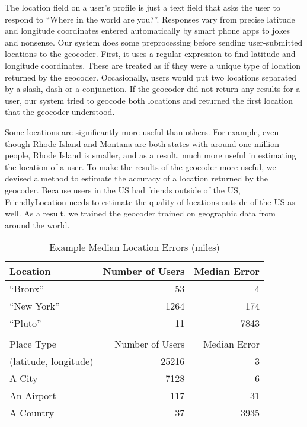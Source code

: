 The location field on a user's profile is just a text field that asks the user
to respond to ``Where in the world are you?''.
Responses vary from precise latitude and longitude coordinates entered
automatically by smart phone apps to jokes and nonsense.
Our system does some preprocessing before sending user-submitted locations to
the geocoder.
First, it uses a regular expression to find latitude and longitude coordinates.
These are treated as if they were a unique type of location returned by the
geocoder.
Occasionally, users would put two locations separated by a slash, dash or a
conjunction.
If the geocoder did not return any results for a user, our system tried to
geocode both locations and returned the first location that the geocoder
understood.

Some locations are significantly more useful than others.
For example, even though Rhode Island and Montana are both states with around
one million people, Rhode Island is smaller, and as a result, much more useful
in estimating the location of a user.
To make the results of the geocoder more useful, we devised a method to
estimate the accuracy of a location returned by the geocoder.
Because users in the US had friends outside of the US, FriendlyLocation needs
to estimate the quality of
locations outside of the US as well.
As a result, we trained the geocoder trained on geographic data from around the
world.

\begin{table}[t]
\centering
\caption{Example Median Location Errors (miles)}
\begin{tabular}{l r r} 
Location&Number of Users&Median Error\\ \hline
``Bronx''&53&4\\
``New York''&1264&174\\
``Pluto''&11&7843\\ \hline
\\
Place Type&Number of Users&Median Error\\ \hline
(latitude, longitude)&25216&3\\
A City&7128&6\\
An Airport&117&31\\
A Country&37&3935\\
\hline\end{tabular}
\label{tab:MedianLocErr}
\end{table}

